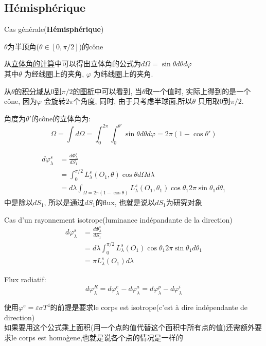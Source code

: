\documentclass{article}
\begin{document}
\subsection{H\'emisph\'erique}
Cas g\'en\'erale(\textbf{H\'emisph\'erique})

$\theta$为半顶角($\theta \in [0,\pi/2]$)的c\^one

从\href{http://i.imgbox.com/90aLTQdS.png}{立体角的计算}中可以得出立体角的公式为$d\Omega = \sin \theta d\theta d\varphi $\\
其中$\theta$ 为经线圈上的夹角, $\varphi$ 为纬线圈上的夹角.

从\href{http://i.imgbox.com/1adl5otW.png}{$\theta$的积分域从$0$到$\pi/2$的图析}中可以看到, 当$\theta$取一个值时, 实际上得到的是一个c\^one, 因为$\varphi$ 会旋转$2\pi$个角度, 同时, 由于只考虑半球面,所以$\theta$ 只用取$0$到$\pi/2$.

角度为$\theta'$的c\^one的立体角为:
$$\Omega = \int d\Omega= \int_0^{2\pi} \int_0^{\theta'} \sin \theta d\theta d\varphi = 2\pi(1-\cos \theta')$$

\begin{equation}
	\begin{split}
d\varphi_{\lambda }^s  & = \frac{d \Phi_{\lambda }^s}{dS_1} \\
 & =  \int_{0}^{\pi/2}L_{\lambda }^s(O_1,\theta)\cos \theta d\Omega d \lambda \\
 & = d \lambda \int_{\Omega = 2\pi(1-\cos \theta)} L_{\lambda }^s(O_1,\theta_1)\cos \theta_1 2\pi \sin\theta_1 d\theta_1
	\end{split}
\end{equation}
\lasteq 中是除以$dS_1$, 所以是通过$dS_1$的flux, 也就是说以$dS_1$为研究对象

Cas d'un rayonnement isotrope(luminance ind\'epandante de la direction)
\begin{equation}
	\begin{split}
d\varphi_{\lambda }^s &= \frac{d \Phi_{\lambda }^s}{dS_1}\\
&=d \lambda \int_{0}^{\pi/2}L_{\lambda }^s(O_1)\cos \theta_1 2\pi \sin\theta_1 d\theta_1 \\
&= \pi L_{\lambda }^s(O_1)d\lambda
	\end{split}
\end{equation}

Flux radiatif:
$$d\varphi_{\lambda }^R =d\varphi_{\lambda }^e - d\varphi_{\lambda }^a = d\varphi_{\lambda }^p - d\varphi_{\lambda }^i$$

使用$\varphi^e=\varepsilon \sigma T^4$的前提是要求le corps est isotrope(c'est \`a dire ind\'ependante de direction)\\
如果要用这个公式乘上面积(用一个点的值代替这个面积中所有点的值)还需额外要求le corps est homo\`gene,也就是说各个点的情况是一样的
\end{document}
